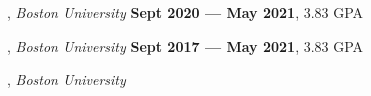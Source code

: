 
, \textit{Boston University}	\hfill {\bfseries Sept 2020 --- May 2021}, 3.83 GPA

, \textit{Boston University} \hfill	{\bfseries Sept 2017 --- May 2021}, 3.83 GPA

, \textit{Boston University}
